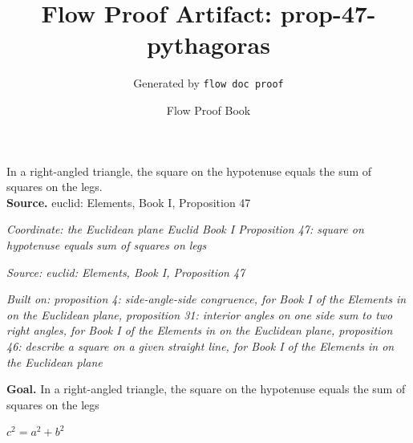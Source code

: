 \documentclass[11pt]{article}
\title{Flow Proof Artifact: prop-47-pythagoras}
\author{Generated by \texttt{flow doc proof}}
\date{Flow Proof Book}
\theoremstyle{definition}
\begin{document}
\maketitle
In a right-angled triangle, the square on the hypotenuse equals the sum of squares on the legs.\\[0.5em]
\textbf{Source.} euclid: Elements, Book I, Proposition 47\\[0.5em]
\bigskip
{}\par
\smallskip\noindent\textit{Coordinate: the Euclidean plane \cdot Euclid Book I \cdot Proposition 47: square on hypotenuse equals sum of squares on legs}\par
\smallskip\noindent\textit{Source: euclid: Elements, Book I, Proposition 47}\par
\smallskip\noindent\textit{Built on: proposition 4: side-angle-side congruence, for Book I of the Elements in on the Euclidean plane, proposition 31: interior angles on one side sum to two right angles, for Book I of the Elements in on the Euclidean plane, proposition 46: describe a square on a given straight line, for Book I of the Elements in on the Euclidean plane}\par
\medskip
\noindent\textbf{Goal.} In a right-angled triangle, the square on the hypotenuse equals the sum of squares on the legs\par
\noindent$\displaystyle c^{2} = a^{2} + b^{2}$\par
\medskip
\noindent
\end{document}
